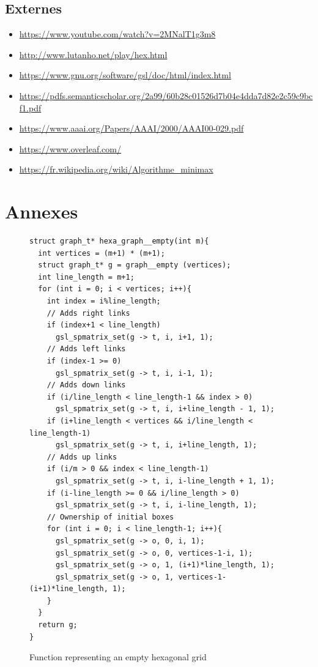\documentclass{article}
\begin{document}
\subsection{Externes}
\begin{itemize}
    \item \url{https://www.youtube.com/watch?v=2MNalT1g3m8}
    \item \url{http://www.lutanho.net/play/hex.html}
    \item \url{https://www.gnu.org/software/gsl/doc/html/index.html}
    \item \url{https://pdfs.semanticscholar.org/2a99/60b28c01526d7b04e4dda7d82e2c59c9bcf1.pdf}
    \item \url{https://www.aaai.org/Papers/AAAI/2000/AAAI00-029.pdf}
    \item \url{https://www.overleaf.com/}
    \item \url{https://fr.wikipedia.org/wiki/Algorithme_minimax}
\end{itemize}

\newpage
\section{Annexes}
\begin{figure}[ht]
    \centering
\begin{lstlisting}
struct graph_t* hexa_graph__empty(int m){
  int vertices = (m+1) * (m+1);
  struct graph_t* g = graph__empty (vertices);
  int line_length = m+1;
  for (int i = 0; i < vertices; i++){
    int index = i%line_length;
    // Adds right links
    if (index+1 < line_length)
      gsl_spmatrix_set(g -> t, i, i+1, 1);
    // Adds left links
    if (index-1 >= 0)
      gsl_spmatrix_set(g -> t, i, i-1, 1);
    // Adds down links
    if (i/line_length < line_length-1 && index > 0)
      gsl_spmatrix_set(g -> t, i, i+line_length - 1, 1);  
    if (i+line_length < vertices && i/line_length < line_length-1)
      gsl_spmatrix_set(g -> t, i, i+line_length, 1);
    // Adds up links
    if (i/m > 0 && index < line_length-1)
      gsl_spmatrix_set(g -> t, i, i-line_length + 1, 1);  
    if (i-line_length >= 0 && i/line_length > 0)
      gsl_spmatrix_set(g -> t, i, i-line_length, 1);
    // Ownership of initial boxes
    for (int i = 0; i < line_length-1; i++){
      gsl_spmatrix_set(g -> o, 0, i, 1);
      gsl_spmatrix_set(g -> o, 0, vertices-1-i, 1);
      gsl_spmatrix_set(g -> o, 1, (i+1)*line_length, 1);  
      gsl_spmatrix_set(g -> o, 1, vertices-1-(i+1)*line_length, 1); 
    }
  }
  return g;
}

\end{lstlisting}
    \caption{Function representing an empty hexagonal grid}
    \label{fig:graph_hex}
\end{figure}
\end{document}
